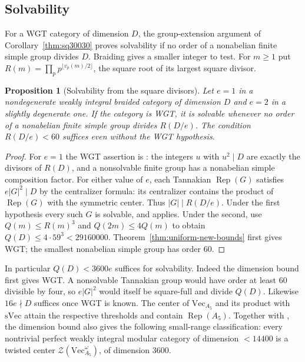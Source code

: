 \documentclass[11pt,a4paper]{article}
\numberwithin{equation}{section}
\newtheorem{proposition}[theorem]{Proposition}
\theoremstyle{remark}
\renewcommand{\Vec}{\mathrm{Vec}}
\newcommand{\Rep}{\operatorname{Rep}}
\newcommand{\sVec}{\mathrm{sVec}}
\begin{document}
\subsection{Solvability}\label{fam:M:sec:11.1}
For a WGT category of dimension $D$, the group-extension argument
of Corollary~\ref{thm:sq30030} proves solvability if no order of a
nonabelian finite simple group divides $D$. Braiding gives a smaller
integer to test. For $m\ge1$ put
$R(m)=\prod_p p^{\lfloor v_p(m)/2\rfloor}$, the square root of
its largest square divisor.

\begin{proposition}[Solvability from the square divisors]\label{fam:M:11.2}\label{prop:solv-square-divisor}
Let $e=1$ in a nondegenerate weakly integral braided category of
dimension $D$ and $e=2$ in a slightly degenerate one. If the category
is WGT, it is solvable whenever no order of a nonabelian finite simple
group divides $R(D/e)$. The condition $R(D/e)<60$ suffices even
without the WGT hypothesis.
\end{proposition}
\begin{proof}
For $e=1$ the WGT assertion is \cite[Corollary~5.2]{NataleCore}:
the integers $u$ with $u^2\mid D$ are exactly the divisors of $R(D)$,
and a nonsolvable finite group has a nonabelian simple composition factor.
For either value of $e$, each Tannakian $\Rep(G)$ satisfies
$e|G|^2\mid D$ by the centralizer formula: its centralizer contains the product of $\Rep(G)$
with the symmetric center. Thus $|G|\mid R(D/e)$. Under the first
hypothesis every such $G$ is solvable, and
\cite[Theorem~5.1]{NataleCore} applies. Under the second, use
$Q(m)\le R(m)^3$ and $Q(2m)\le4Q(m)$ to obtain
$Q(D)\le4\cdot59^3<29160000$. Theorem~\ref{thm:uniform-new-bounds}
first gives WGT; the smallest nonabelian simple group has order $60$.
\end{proof}

In particular $Q(D)<3600e$ suffices for solvability. Indeed the
dimension bound first gives WGT. A nonsolvable Tannakian group would
have order at least $60$ divisible by four, so $e|G|^2$ would itself
be square-full and divide $Q(D)$. Likewise $16e\nmid D$ suffices
once WGT is known. The center of $\Vec_{A_5}$ and its product with
$\sVec$ attain the respective thresholds and contain $\Rep(A_5)$.
Together with \cite{XuDongPerfect}, the dimension bound also gives
the following small-range classification: every nontrivial perfect
weakly integral modular category of dimension $<14400$ is a twisted
center $\mathcal Z(\mathrm{Vec}_{A_5}^{\omega})$, of dimension $3600$.
\end{document}
